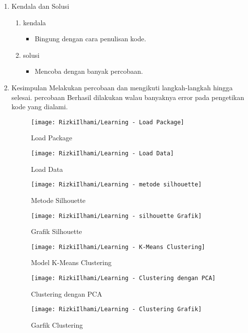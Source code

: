 \clearpage
{}
\begin{enumerate}
\item Kendala dan Solusi

\begin{enumerate}
    \item kendala
\begin{itemize}
    \item Bingung dengan cara penulisan kode.
\end{itemize}
    \item solusi
\begin{itemize}
    \item Mencoba dengan banyak percobaan.
\end{itemize}
\end{enumerate}

\item Kesimpulan
\newline Melakukan percobaan dan mengikuti langkah-langkah hingga selesai.
percobaan Berhasil dilakukan walau banyaknya error pada pengetikan kode yang dialami.


\begin{figure}[!ht]
    \texttt{[image: RizkiIlhami/Learning - Load Package]}
    \caption{Load Package}
    \label{gam:hasil Learning}
\end{figure}
	
\begin{figure}[!ht]
    \texttt{[image: RizkiIlhami/Learning - Load Data]}
    \caption{Load Data}
    \label{gam:hasil Learning}
\end{figure}

\begin{figure}[!ht]
    \texttt{[image: RizkiIlhami/Learning - metode silhouette]}
    \caption{Metode Silhouette}
    \label{gam:hasil Learning}
\end{figure}

\begin{figure}[!ht]
    \texttt{[image: RizkiIlhami/Learning - silhouette Grafik]}
    \caption{Grafik Silhouette}
    \label{gam:hasil Learning}
\end{figure}

\begin{figure}[!ht]
    \texttt{[image: RizkiIlhami/Learning - K-Means Clustering]}
    \caption{Model K-Means Clustering}
    \label{gam:hasil Learning}
\end{figure}

\begin{figure}[!ht]
    \texttt{[image: RizkiIlhami/Learning - Clustering dengan PCA]}
    \caption{Clustering dengan PCA}
    \label{gam:hasil Learning}
\end{figure}

\begin{figure}[!ht]
    \texttt{[image: RizkiIlhami/Learning - Clustering Grafik]}
    \caption{Garfik Clustering}
    \label{gam:hasil Learning}
\end{figure}

\end{enumerate}
